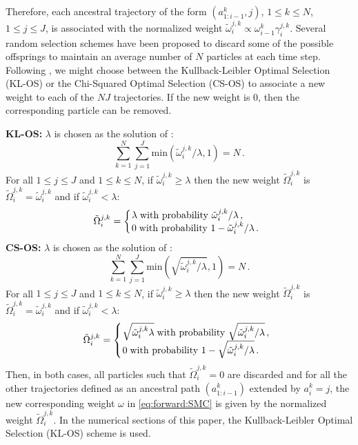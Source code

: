 \documentclass[nolayout]{article}
\theoremstyle{plain}
\theoremstyle{definition}
\newcommand{\1}{\mathbbm{1}}
\def\eqsp{\,}
\begin{document}
Therefore, each ancestral trajectory of the form  $(a^k_{1:i-1},j)$, $1\le k \le N$, $1\le j\le J$, is associated with the normalized weight $\tilde{\omega}^{j,k}_{i} \propto \omega^k_{i-1}\gamma_i^{j,k}$. Several random selection schemes have been proposed to discard some of the possible offsprings to maintain an average number of $N$ particles at each time step. Following \cite{barembruch:garivier:moulines:2008}, we might choose between the Kullback-Leibler Optimal Selection (KL-OS) or the Chi-Squared Optimal Selection (CS-OS) to associate a new weight to each of the $NJ$ trajectories. If the new weight is 0, then the corresponding particle can be removed.

\vspace{.2cm}

\noindent\textbf{KL-OS:} $\lambda$ is chosen as the solution of :
\[
\sum_{k=1}^N\sum_{j=1}^J\mathrm{min}\left(\tilde{\omega}^{j,k}_{i}/\lambda,1\right) = N\eqsp.
\]
For all $1\le j \le J$ and $1\le k \le N$, if $\tilde{\omega}^{j,k}_{i}\ge \lambda$ then the new weight $\tilde{\Omega}^{j,k}_{i}$ is $\tilde{\Omega}^{j,k}_{i}=\tilde{\omega}^{j,k}_{i}$ and if $\tilde{\omega}^{j,k}_{i}< \lambda$:
\[
\tilde{\Omega}^{j,k}_{i}=
\left\{
 \begin{array}{rl}
  &\hspace{-.5cm}\lambda \;\mbox{with probability } \tilde{\omega}^{j,k}_{i}/\lambda\eqsp,\\
&\hspace{-.5cm}0 \;\mbox{with probability } 1-\tilde{\omega}^{j,k}_{i}/\lambda\eqsp.
\end{array}
\right.
\]
\textbf{CS-OS:} $\lambda$ is chosen as the solution of :
\[
\sum_{k=1}^N\sum_{j=1}^J\mathrm{min}\left(\sqrt{\tilde{\omega}^{j,k}_{i}/\lambda},1\right) = N\eqsp.
\]
For all $1\le j \le J$ and $1\le k \le N$, if $\tilde{\omega}^{j,k}_{i}\ge \lambda$ then the new weight $\tilde{\Omega}^{j,k}_{i}$ is $\tilde{\Omega}^{j,k}_{i}=\tilde{\omega}^{j,k}_{i}$ and if $\tilde{\omega}^{j,k}_{i}< \lambda$:
\[
\tilde{\Omega}^{j,k}_{i}=
\left\{
 \begin{array}{rl}
  &\hspace{-.5cm}\sqrt{\tilde{\omega}^{j,k}_{i}\lambda} \;\mbox{with probability } \sqrt{\tilde{\omega}^{j,k}_{i}/\lambda}\eqsp,\\
&\hspace{-.5cm}0 \;\mbox{with probability } 1-\sqrt{\tilde{\omega}^{j,k}_{i}/\lambda}\eqsp.
\end{array}
\right.
\]
Then, in both cases, all particles such that $\tilde{\Omega}^{j,k}_{i} = 0$ are discarded and for all the other trajectories defined as an ancestral path $(a^k_{1:i-1})$ extended by $a^k_i = j$, the new corresponding weight $\omega$ in \eqref{eq:forward:SMC} is given by the normalized weight $\tilde{\Omega}^{j,k}_{i}$. In the numerical sections of this paper, the Kullback-Leibler Optimal Selection (KL-OS) scheme is used.
\end{document}
